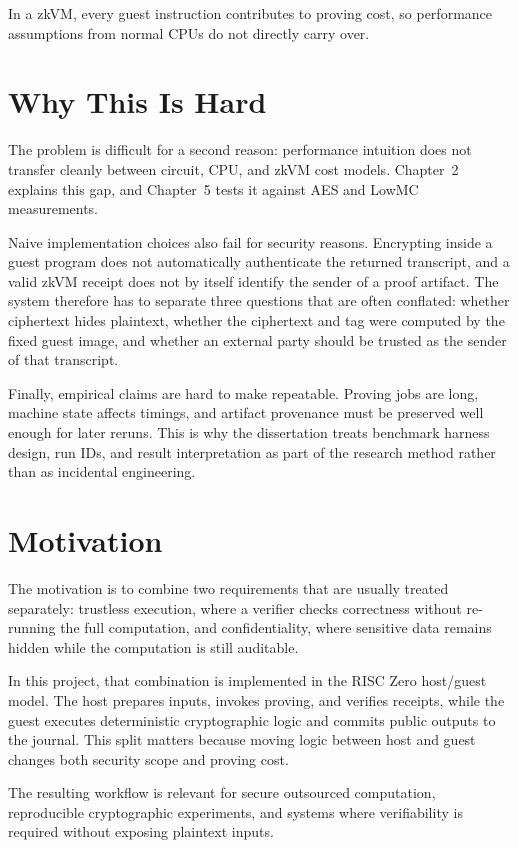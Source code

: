In a zkVM, every guest instruction contributes to proving cost, so performance
assumptions from normal CPUs do not directly carry over.

\section{Why This Is Hard}

The problem is difficult for a second reason: performance intuition does not
transfer cleanly between circuit, CPU, and zkVM cost models. Chapter~2 explains
this gap, and Chapter~5 tests it against AES and LowMC measurements.

Naive implementation choices also fail for security reasons. Encrypting inside a
guest program does not automatically authenticate the returned transcript, and a
valid zkVM receipt does not by itself identify the sender of a proof artifact.
The system therefore has to separate three questions that are often conflated:
whether ciphertext hides plaintext, whether the ciphertext and tag were computed
by the fixed guest image, and whether an external party should be trusted as the
sender of that transcript.

Finally, empirical claims are hard to make repeatable. Proving jobs are long,
machine state affects timings, and artifact provenance must be preserved well
enough for later reruns. This is why the dissertation treats benchmark harness
design, run IDs, and result interpretation as part of the research method rather
than as incidental engineering.

\section{Motivation}

The motivation is to combine two requirements that are usually treated
separately: trustless execution, where a verifier checks correctness without
re-running the full computation, and confidentiality, where sensitive data
remains hidden while the computation is still auditable.

In this project, that combination is implemented in the RISC Zero host/guest
model. The host prepares inputs, invokes proving, and verifies receipts, while
the guest executes deterministic cryptographic logic and commits public outputs
to the journal. This split matters because moving logic between host and guest
changes both security scope and proving cost.

The resulting workflow is relevant for secure outsourced computation,
reproducible cryptographic experiments, and systems where verifiability is
required without exposing plaintext inputs.

